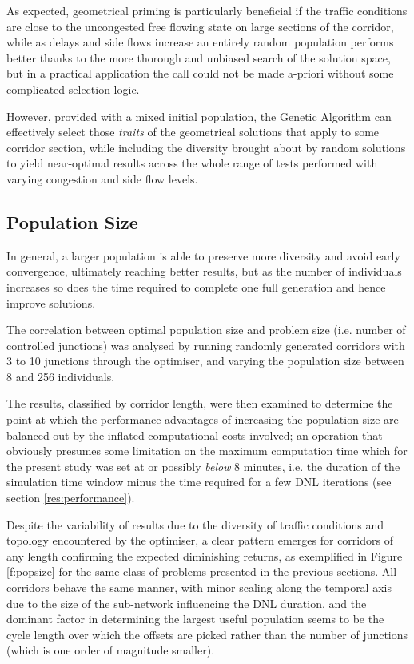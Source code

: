 As expected, geometrical priming is particularly beneficial if the traffic conditions are close to the uncongested free flowing state on large sections of the corridor, while as delays and side flows increase an entirely random population performs better thanks to the more thorough and unbiased search of the solution space, but in a practical application the call could not be made a-priori without some complicated selection logic.

However, provided with a mixed initial population, the Genetic Algorithm can effectively select those \emph{traits} of the geometrical solutions that apply to some corridor section, while including the diversity brought about by random solutions to yield near-optimal results across the whole range of tests performed with varying congestion and side flow levels.

\subsection{Population Size} \label{r:popsize}
In general, a larger population is able to preserve more diversity and avoid early convergence, ultimately reaching better results, but as the number of individuals increases so does the time required to complete one full generation and hence  improve solutions.

The correlation between optimal population size and problem size (i.e. number of controlled junctions) was analysed by running randomly generated corridors with 3 to 10 junctions through the optimiser, and varying the population size between 8 and 256 individuals. 
 
The results, classified by corridor length, were then examined to determine the point at which the performance advantages of increasing the population size are balanced out by the inflated computational costs involved; an operation that obviously presumes some limitation on the maximum computation time which for the present study was set at or possibly \emph{below} 8 minutes, i.e. the duration of the simulation time window minus the time required for a few DNL iterations (see section \ref{res:performance}).

Despite the variability of results due to the diversity of traffic conditions and topology encountered by the optimiser, a clear pattern emerges for corridors of any length confirming the expected diminishing returns, as exemplified in Figure \ref{f:popsize} for the same class of problems presented in the previous sections.
All corridors behave the same manner, with minor scaling along the temporal axis due to the size of the sub-network influencing the DNL duration, and the dominant factor in determining the largest useful population seems to be the cycle length over which the offsets are picked rather than the number of junctions (which is one order of magnitude smaller).

